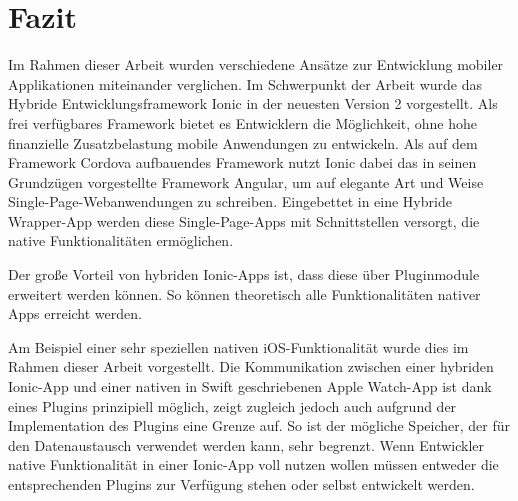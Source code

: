 \chapter{Fazit}
%
Im Rahmen dieser Arbeit wurden verschiedene Ansätze zur Entwicklung mobiler Applikationen miteinander verglichen. Im Schwerpunkt der Arbeit wurde das Hybride Entwicklungsframework Ionic in der neuesten Version 2 vorgestellt. Als frei verfügbares Framework bietet es Entwicklern die Möglichkeit, ohne hohe finanzielle Zusatzbelastung mobile Anwendungen zu entwickeln. Als auf dem Framework Cordova aufbauendes Framework nutzt Ionic dabei das in seinen Grundzügen vorgestellte Framework Angular, um auf elegante Art und Weise Single-Page-Webanwendungen zu schreiben. Eingebettet in eine Hybride Wrapper-App werden diese Single-Page-Apps mit Schnittstellen versorgt, die native Funktionalitäten ermöglichen. 

Der große Vorteil von hybriden Ionic-Apps ist, dass diese über Pluginmodule erweitert werden können. So können theoretisch alle Funktionalitäten nativer Apps erreicht werden.

Am Beispiel einer sehr speziellen nativen iOS-Funktionalität wurde dies im Rahmen dieser Arbeit vorgestellt. Die Kommunikation zwischen einer hybriden Ionic-App und einer nativen in Swift geschriebenen Apple Watch-App ist dank eines Plugins prinzipiell möglich, zeigt zugleich jedoch auch aufgrund der Implementation des Plugins eine Grenze auf. So ist der mögliche Speicher, der für den Datenaustausch verwendet werden kann, sehr begrenzt. Wenn Entwickler native Funktionalität in einer Ionic-App voll nutzen wollen müssen entweder die entsprechenden Plugins zur Verfügung stehen oder selbst entwickelt werden.